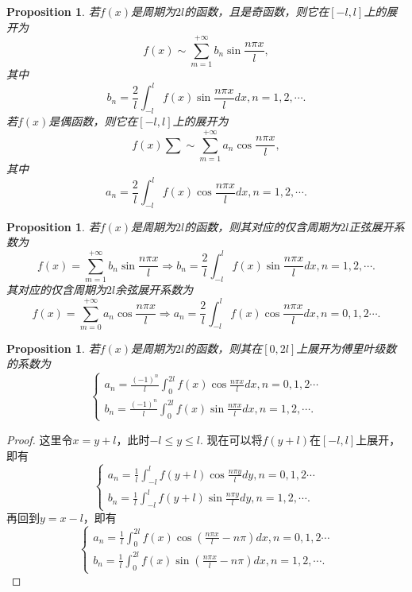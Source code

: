 \documentclass{article}
\newtheorem{proposition}[theorem]{Proposition}
\begin{document}
\begin{proposition}
\rm 若$f(x)$是周期为$2l$的函数，且是奇函数，则它在$[-l,l]$上的展开为
$$
f(x) \sim \sum\limits_{m=1}^{+\infty} b_n \sin \frac{n\pi x}{l},
$$
其中
$$
b_n = \frac{2}{l} \int_{-l}^{l} f(x)\sin \frac{n\pi x}{l}dx, n = 1,2,\cdots.
$$
若$f(x)$是偶函数，则它在$[-l,l]$上的展开为
$$
f(x) \sum \sim \sum\limits_{m=1}^{+\infty} a_n \cos \frac{n\pi x}{l},
$$
其中
$$
a_n = \frac{2}{l} \int_{-l}^{l} f(x)\cos \frac{n\pi x}{l}dx, n = 1,2,\cdots.
$$
\end{proposition}

\begin{proposition}
\rm 若$f(x)$是周期为$2l$的函数，则其对应的仅含周期为$2l$正弦展开系数为
$$
f(x) = \sum\limits_{m=1}^{+\infty}b_n\sin \frac{n\pi x}{l} \Rightarrow b_n = \frac{2}{l} \int_{-l}^{l} f(x)\sin \frac{n\pi x}{l} dx,n = 1,2,\cdots.
$$
其对应的仅含周期为$2l$余弦展开系数为
$$
f(x) = \sum\limits_{m=0}^{+\infty}a_n\cos\frac{n\pi x}{l} \Rightarrow a_n = \frac{2}{l} \int_{-l}^{l} f(x)\cos \frac{n\pi x}{l} dx, n = 0,1,2\cdots. 
$$
\end{proposition}

\begin{proposition}
\rm 若$f(x)$是周期为$2l$的函数，则其在$[0,2l]$上展开为傅里叶级数的系数为
$$
\left\{
\begin{array}{ll}
a_n = \frac{(-1)^n}{l} \int_{0}^{2l} f(x)\cos \frac{n\pi x}{l}dx, n =  0,1,2 \cdots \\
b_n = \frac{(-1)^n}{l} \int_{0}^{2l} f(x)\sin \frac{n\pi x}{l}dx, n = 1,2,\cdots.
\end{array} \right.
$$
\end{proposition}

\begin{proof}
这里令$x=y+l$，此时$-l \leq y \leq l$. 现在可以将$f(y+l)$在$[-l,l]$上展开，即有
$$
\left\{
\begin{array}{ll}
a_n = \frac{1}{l} \int_{-l}^{l} f\left(y+l\right)\cos \frac{n\pi y}{l}dy, n =  0,1,2\cdots \\
b_n = \frac{1}{l} \int_{-l}^{l} f\left(y+l\right)\sin \frac{n\pi y}{l}dy, n = 1,2,\cdots.
\end{array} \right.
$$
再回到$y = x-l$，即有
$$
\left\{
\begin{array}{ll}
a_n = \frac{1}{l} \int_{0}^{2l} f(x) \cos (\frac{n\pi x}{l}-n\pi) dx, n =  0,1,2\cdots \\
b_n = \frac{1}{l} \int_{0}^{2l} f(x) \sin (\frac{n\pi x}{l}-n\pi) dx, n = 1,2,\cdots.
\end{array} \right.
$$
\end{proof}
\end{document}
